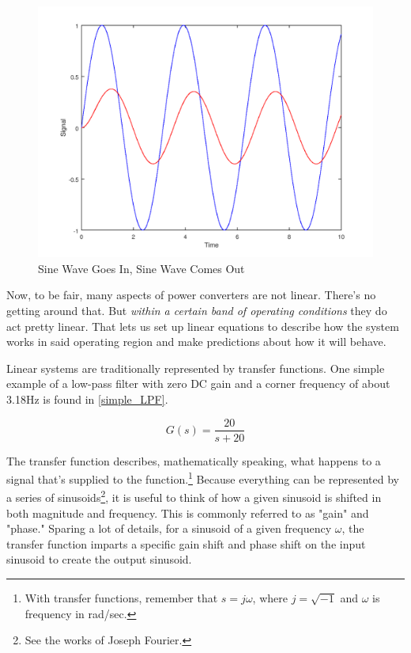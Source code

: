 \begin{figure}[h]
\centering
\includegraphics[scale=0.5]{sine_in_sine_out.png}
\caption{Sine Wave Goes In, Sine Wave Comes Out}\label{s_in_s_out}
\end{figure}

Now, to be fair, many aspects of power converters are not linear. There's no getting around that. But \emph{within a certain band of operating conditions} they do act pretty linear. That lets us set up linear equations to describe how the system works in said operating region and make predictions about how it will behave.

Linear systems are traditionally represented by transfer functions. One simple example of a low-pass filter with zero DC gain and a corner frequency of about 3.18Hz is found in \ref{simple_LPF}.

\begin{equation}
G(s) = \frac{20}{s+20}
\label{simple_LPF}
\end{equation}

The transfer function describes, mathematically speaking, what happens to a signal that's supplied to the function.\footnote{With transfer functions, remember that $s = j\omega$, where $j = \sqrt{-1}$ and $\omega$ is frequency in rad/sec.} Because everything can be represented by a series of sinusoids\footnote{See the works of Joseph Fourier.}, it is useful to think of how a given sinusoid is shifted in both magnitude and frequency. This is commonly referred to as "gain" and "phase." Sparing a lot of details, for a sinusoid of a given frequency $\omega$, the transfer function imparts a specific gain shift and phase shift on the input sinusoid to create the output sinusoid. 

